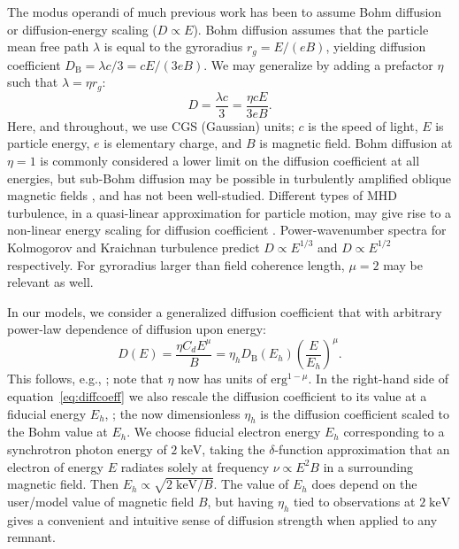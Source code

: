 \documentclass[iop, apj, numberedappendix, twocolappendix]{emulateapj}
\newcommand*{\mt}{\mathrm}
\newcommand*{\unit}[1]{\;\mt{#1}}  %
\begin{document}
The modus operandi of much previous work has been to assume Bohm diffusion or
diffusion-energy scaling ($D \propto E$).  Bohm diffusion assumes that the
particle mean free path $\lambda$ is equal to the gyroradius $r_g = E/(eB)$,
yielding diffusion coefficient $D_{\mt{B}} = \lambda c / 3 = c E / (3 e B)$.
We may generalize by adding a prefactor $\eta$ such that $\lambda = \eta r_g$:
\begin{equation} \label{eq:bohm}
    D = \frac{\lambda c}{3} = \frac{\eta c E}{3 e B} .
\end{equation}
Here, and throughout, we use CGS (Gaussian) units; $c$ is the speed of light,
$E$ is particle energy, $e$ is elementary charge, and $B$ is magnetic field.
Bohm diffusion at $\eta = 1$ is commonly considered a lower
limit on the diffusion coefficient at all energies, but sub-Bohm diffusion may be
possible in turbulently amplified oblique magnetic fields
\citep[e.g.,][]{reville2013}, and has not been well-studied.
 Different types of MHD turbulence, in a
quasi-linear approximation for particle motion, may give rise to a non-linear
energy scaling for diffusion coefficient \citep{giacalone1999, reynolds2004}.
Power-wavenumber spectra for Kolmogorov and Kraichnan turbulence predict $D
\propto E^{1/3}$ and $D \propto E^{1/2}$ respectively.  For gyroradius larger
than field coherence length, $\mu = 2$ may be relevant as well.

In our models, we consider a generalized diffusion coefficient that with
arbitrary power-law dependence of diffusion upon energy:
\begin{equation} \label{eq:diffcoeff}
    D(E) = \frac{\eta C_d E^\mu}{B}
         = \eta_h D_{\mt{B}}\left(E_h\right) \left(\frac{E}{E_h}\right)^\mu .
\end{equation}
This follows, e.g., \citet{parizot2006}; note that $\eta$ now has units of
$\mathrm{erg}^{1-\mu}$.  In the right-hand side of
equation~\eqref{eq:diffcoeff} we also rescale the diffusion coefficient to its
value at a fiducial energy $E_h$, ; the now dimensionless $\eta_h$ is the
diffusion coefficient scaled to the Bohm value at $E_h$.  We choose fiducial
electron energy $E_h$ corresponding to a synchrotron photon energy of $2
\unit{keV}$, taking the $\delta$-function approximation that an electron of
energy $E$ radiates solely at frequency $\nu \propto E^2 B$ in a surrounding
magnetic field.  Then $E_h \propto \sqrt{2 \unit{keV} / B}$.  The value of
$E_h$ does depend on the user/model value of magnetic field $B$, but having
$\eta_h$ tied to observations at $2 \unit{keV}$ gives a convenient and
intuitive sense of diffusion strength when applied to any remnant.
\end{document}
